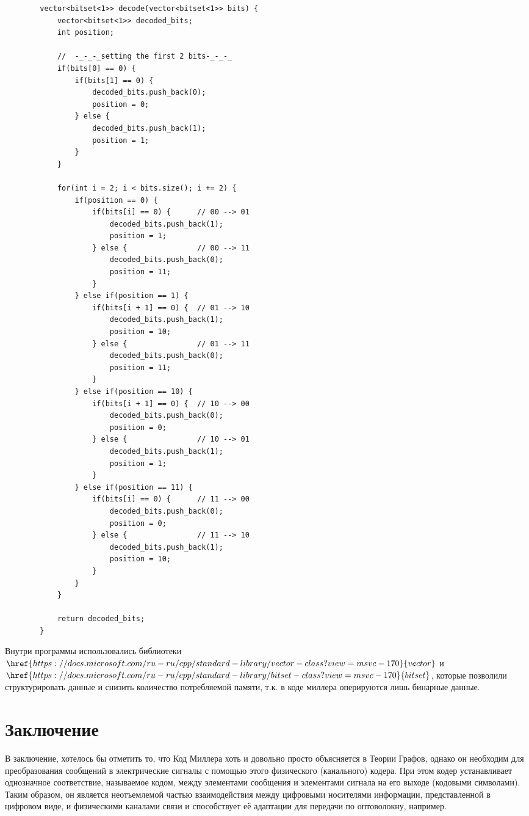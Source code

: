 \documentclass[utf8,14pt,a4paper,oneside,russian]{book}
\begin{document}
	\begin{lstlisting}
		vector<bitset<1>> decode(vector<bitset<1>> bits) {
			vector<bitset<1>> decoded_bits;
			int position;
			
			//  -_-_-_setting the first 2 bits-_-_-_
			if(bits[0] == 0) {
				if(bits[1] == 0) {
					decoded_bits.push_back(0);
					position = 0;
				} else {
					decoded_bits.push_back(1);
					position = 1;
				}
			}
			
			for(int i = 2; i < bits.size(); i += 2) {
				if(position == 0) {
					if(bits[i] == 0) {      // 00 --> 01
						decoded_bits.push_back(1);
						position = 1;
					} else {                // 00 --> 11
						decoded_bits.push_back(0);
						position = 11;
					}
				} else if(position == 1) {
					if(bits[i + 1] == 0) {  // 01 --> 10
						decoded_bits.push_back(1);
						position = 10;
					} else {                // 01 --> 11
						decoded_bits.push_back(0);
						position = 11;
					}
				} else if(position == 10) {
					if(bits[i + 1] == 0) {  // 10 --> 00
						decoded_bits.push_back(0);
						position = 0;
					} else {                // 10 --> 01
						decoded_bits.push_back(1);
						position = 1;
					}
				} else if(position == 11) {
					if(bits[i] == 0) {      // 11 --> 00
						decoded_bits.push_back(0);
						position = 0;
					} else {                // 11 --> 10
						decoded_bits.push_back(1);
						position = 10;
					}
				}
			}
			
			return decoded_bits;
		}
	\end{lstlisting}	
	
	Внутри программы использовались библиотеки $\href{https://docs.microsoft.com/ru-ru/cpp/standard-library/vector-class?view=msvc-170}{vector}$ и $\href{https://docs.microsoft.com/ru-ru/cpp/standard-library/bitset-class?view=msvc-170}{bitset}$, которые позволили структурировать данные и снизить количество потребляемой памяти, т.к. в коде миллера оперируются лишь бинарные данные.
	
	\newpage
	\section{Заключение}
	В заключение, хотелось бы отметить то, что Код Миллера хоть и довольно просто объясняется в Теории Графов, однако он необходим для преобразования сообщений в электрические сигналы с помощью этого физического (канального) кодера. При
	этом кодер устанавливает однозначное соответствие, называемое кодом, между элементами сообщения и элементами сигнала на его выходе (кодовыми символами). Таким образом, он является неотъемлемой частью взаимодействия между цифровыми носителями информации, представленной в цифровом виде, и физическими каналами связи и способствует её адаптации для передачи по оптоволокну, например.
	
\end{document}
